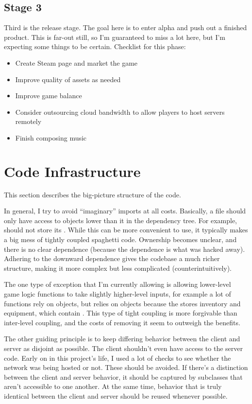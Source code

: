 \documentclass{article}
\begin{document}
\subsection{Stage 3}
Third is the release stage. The goal here is to enter alpha and push out a finished product.
This is far-out still, so I'm guaranteed to miss a lot here, but I'm expecting some things to
be certain.
Checklist for this phase:
\begin{itemize}
    \item Create Steam page and market the game
    \item Improve quality of assets as needed
    \item Improve game balance
    \item Consider outsourcing cloud bandwidth to allow players to host servers remotely
    \item Finish composing music
\end{itemize}

\section{Code Infrastructure}
This section describes the big-picture structure of the code.

In general, I try to avoid ``imaginary'' imports at all costs. Basically, a file should only have
access to objects lower than it in the dependency tree. For example,  should
not store its . While this can be more convenient to use, it typically makes a
big mess of tightly coupled spaghetti code. Ownership becomes unclear, and there is no clear dependence
(because the dependence is what was hacked away). Adhering to the downward dependence gives the codebase
a much richer structure, making it more complex but less complicated (counterintuitively).

The one type of exception that I'm currently allowing is allowing lower-level game logic
functions to take slightly higher-level inputs, for example a lot of  functions rely
on  objects, but  relies on  objects because
the  stores inventory and equipment, which contain . This type
of tight coupling is more forgivable than inter-level coupling, and the costs of removing it seem
to outweigh the benefits.

The other guiding principle is to keep differing behavior between the client and server as disjoint as possible.
The client shouldn't even have access to the server code. Early on in this project's life, I used a lot of checks
to see whether the network was being hosted or not. These should be avoided. If there's a distinction between
the client and server behavior, it should be captured by subclasses that aren't accessible to one another.
At the same time, behavior that is truly identical between the client and server should be reused whenever
possible.
\end{document}
